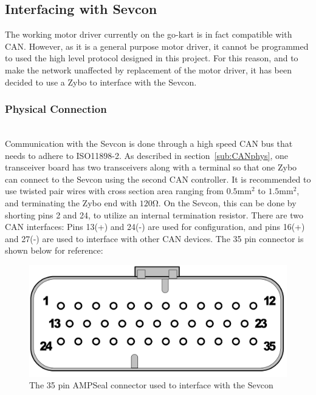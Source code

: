 

\subsection{Interfacing with Sevcon}\label{sub:Sevcon_interfacing}
The working motor driver currently on the go-kart is in fact compatible with CAN.
However, as it is a general purpose motor driver, it cannot be programmed to used the high level protocol designed in this project. 
For this reason, and to make the network unaffected by replacement of the motor driver, it has been decided to use a Zybo to interface with the Sevcon.

\subsubsection{Physical Connection}\label{sub:sevcon_physical_connection}~\\
Communication with the Sevcon is done through a high speed CAN bus that needs to adhere to ISO11898-2.
As described in section~\ref{sub:CANphys}, one transceiver board has two transceivers along with a terminal so that one Zybo can connect to the Sevcon using the second CAN controller.
It is recommended to use twisted pair wires with cross section area ranging from $0.5 \si{\milli \meter \squared}$ to $1.5 \si{\milli \meter \squared}$, and terminating the Zybo end with $120 \si{\ohm}$.
On the Sevcon, this can be done by shorting pins 2 and 24, to utilize an internal termination resistor.
There are two CAN interfaces: Pins 13(+) and 24(-) are used for configuration, and pins 16(+) and 27(-) are used to interface with other CAN devices.
The 35 pin connector is shown below for reference:

\begin{figure}[h]
	\centering
	\includegraphics[width = 0.6\linewidth]{graphics/35_pin_dsub}
	\caption{The 35 pin AMPSeal connector used to interface with the Sevcon}
	\label{fig:35_pin_dsub}
\end{figure}


